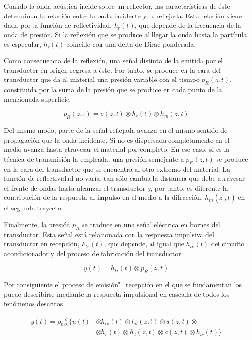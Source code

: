 Cuando la onda acústica incide sobre un reflector, las características de
éste determinan la relación entre la onda incidente y la reflejada. Esta
relación viene dada por la función de reflectividad, $h_r(t)$, que depende
de la frecuencia de la onda de presión. Si la reflexión que se produce al
llegar la onda hasta la partícula es especular, $h_r(t)$ coincide con una
delta de Dirac ponderada.

Como consecuencia de la reflexión, una señal distinta de la emitida por el
transductor en origen regresa a éste. Por tanto, se produce en la cara del
transductor que da al material una presión variable con el tiempo $p_R(z,
t)$, constituida por la suma de la presión que se produce en cada punto de
la mencionada superficie.

\begin{equation}
	p_R(z, t) = p(z, t)\otimes h_r(t)\otimes h_m(z, t)
	\label{eq:recpressure}
\end{equation}

Del mismo modo, parte de la señal reflejada avanza en el mismo sentido de
propagación que la onda incidente. Si no es dispersada completamente en el
medio avanza hasta atravesar el material por completo. En ese caso, si es
la técnica de transmisión la empleada, una presión semejante a $p_R(z, t)$
se produce en la cara del transductor que se encuentra al otro extremo del
material. La función de reflectividad no varía, tan sólo cambia la
distancia que debe atravesar el frente de ondas hasta alcanzar el
transductor y, por tanto, es diferente la contribución de la respuesta al
impulso en el medio a la difracción, $h_m(z^\prime, t)$ en el segundo
trayecto.

Finalmente, la presión $p_R$ se traduce en una señal eléctrica en bornes
del transductor. Esta señal está relacionada con la respuesta impulsiva del
transductor en recepción, $h_{tr}(t)$, que depende, al igual que
$h_{te}(t)$ del circuito acondicionador y del proceso de fabricación del
transductor.

\begin{equation}
	y(t) = h_{tr}(t)\otimes p_R(z, t)
	\label{eq:receiver}
\end{equation}

Por consiguiente el proceso de emisión"=recepción en el que se fundamentan
los  puede describirse mediante la respuesta impulsional en
cascada de todos los fenómenos descritos.

\begin{equation}\label{eq:emirec}
	\begin{split}
		y(t) = \rho_0\frac{\partial}{\partial t}\{u(t)& \otimes
		h_{te}(t)\otimes h_d(z, t)\otimes a(z, t)\otimes \\
		&\otimes h_r(t)\otimes h_d(z, t)\otimes a(z, t)\otimes
		h_{tr}(t)\}
	\end{split}
\end{equation}

